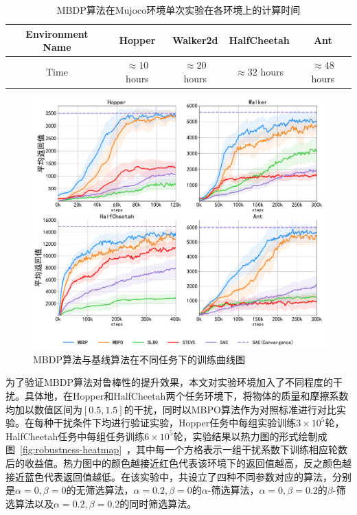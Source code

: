 \begin{table}[ht]
\centering
\caption{MBDP算法在Mujoco环境单次实验在各环境上的计算时间}
\begin{tabular}{c|c|c|c|c}
\toprule
Environment Name  & Hopper      & Walker2d    & HalfCheetah & Ant         \\
\midrule
Time & $\approx 10$ hours & $\approx 20$ hours & $\approx 32$ hours & $\approx 48$ hours \\
\bottomrule
\end{tabular}
\label{tab:run-time}
\end{table}

\begin{figure}[t]
  \centering
  \includegraphics[width=\textwidth]{figures/performance.pdf}
  \caption{MBDP算法与基线算法在不同任务下的训练曲线图}
  \label{fig:performance}
\end{figure}

为了验证MBDP算法对鲁棒性的提升效果，本文对实验环境加入了不同程度的干扰。具体地，在Hopper和HalfCheetah两个任务环境下，将物体的质量和摩擦系数均加以数值区间为$[0.5,1.5]$的干扰，同时以MBPO算法作为对照标准进行对比实验。在每种干扰条件下均进行验证实验，Hopper任务中每组实验训练$3\times 10^5$轮，HalfCheetah任务中每组任务训练$6\times 10^5$轮，实验结果以热力图的形式绘制成图~\ref{fig:robustness-heatmap}~，其中每一个方格表示一组干扰系数下训练相应轮数后的收益值。热力图中的颜色越接近红色代表该环境下的返回值越高，反之颜色越接近蓝色代表返回值越低。在该实验中，共设立了四种不同参数对应的算法，分别是$\alpha=0, \beta=0$的无筛选算法，$\alpha=0.2, \beta=0$的$\alpha$-筛选算法，$\alpha=0, \beta=0.2$的$\beta$-筛选算法以及$\alpha=0.2, \beta=0.2$的同时筛选算法。

